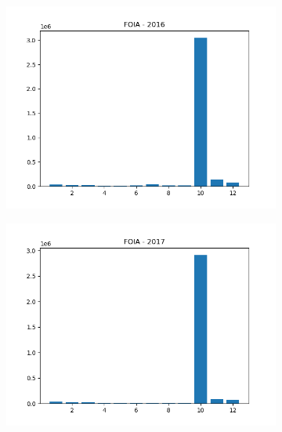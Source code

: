 \documentclass{article}
\begin{document}
\begin{figure}[H]
\begin{subfigure}{.5\textwidth}
        \includegraphics[width=\textwidth]{../../output/figures/annual_source_distribution/FOIA_data_dist_2016.png}
    \end{subfigure}
    \begin{subfigure}{.5\textwidth}
        \centering
        \includegraphics[width=\textwidth]{../../output/figures/annual_source_distribution/FOIA_data_dist_2017.png}
    \end{subfigure}
\end{figure}

\newpage 
\end{document}
